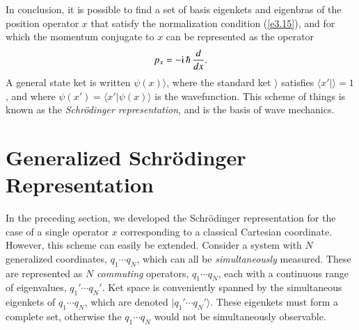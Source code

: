 In conclusion, it is possible to find a set of basis eigenkets and eigenbras
of the position operator $x$ that satisfy the normalization condition (\ref{e3.15}),
and for which the momentum conjugate to $x$ can be represented as the operator
\begin{equation}
p_x = -{\rm i}\,\hbar\,\frac{d}{dx}.
\end{equation}
A general state ket is written $\psi(x)\rangle$, where the standard ket $\rangle$
satisfies $\langle x'|\rangle = 1$, and where $\psi(x')= \langle x'|
\psi(x)\rangle$ is the wavefunction. 
This scheme of things is known as the {\em Schr\"{o}dinger representation}, and is the
basis of wave mechanics. 

\section{Generalized Schr\"{o}dinger Representation}\label{s3.5}
In the preceding section, we developed the Schr\"{o}dinger  representation
for the case of a single 
operator $x$ corresponding to a classical Cartesian coordinate. However, this scheme
can easily be extended. Consider a system with $N$ generalized coordinates, 
$q_1\cdots q_N$, which can all be {\em simultaneously}\/ measured. These are represented 
as $N$ {\em  commuting}\/ operators, $q_1\cdots q_N$, each with a continuous range
of eigenvalues, $q_1'\cdots q_N'$.
 Ket space is conveniently spanned  by  the simultaneous
eigenkets of $q_1\cdots q_N$, which are denoted $|q_1'\cdots q_N'\rangle$. These 
eigenkets must form a complete set, otherwise the $q_1\cdots q_N$ would not be 
simultaneously observable. 

